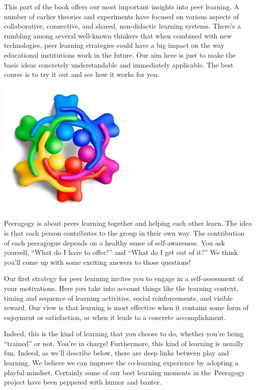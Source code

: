 This part of the book offers our most important insights into peer
learning. A number of earlier theories and experiments have focused on
various aspects of collaborative, connective, and shared, non-didactic
learning systems. There's a rumbling among several well-known thinkers
that when combined with new technologies, peer learning strategies could
have a big impact on the way educational institutions work in the
future. Our aim here is just to make the basic ideas concretely
understandable and immediately applicable. The best course is to try it
out and see how it works for you.

\begin{center}
\includegraphics[width=.4\textwidth]{../pictures/peeragogy-in-action.jpg}
\end{center}

Peeragogy is about peers learning together and helping each other learn.
The idea is that each person contributes to the group in their own way.
The contribution of each peeragogue depends on a healthy sense of
self-awareness. You ask yourself, ``What do I have to offer?'' and
``What do I get out of it?'' We think you'll come up with some exciting
answers to those questions!

Our first strategy for peer learning invites you to engage in a
self-assessment of your motivations. Here you take into account things
like the learning context, timing and sequence of learning activities,
social reinforcements, and visible reward. Our view is that learning is
most effective when it contains some form of enjoyment or satisfaction,
or when it leads to a concrete accomplishment.

Indeed, this is the kind of learning that you choose to do, whether
you're being ``trained'' or not. You're in charge! Furthermore, this
kind of learning is usually fun. Indeed, as we'll describe below, there
are deep links between play and learning. We believe we can improve the
co-learning experience by adopting a playful mindset. Certainly some of
our best learning moments in the~Peeragogy project have been peppered
with humor and banter.

